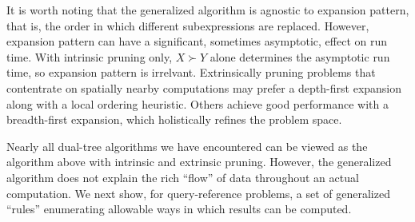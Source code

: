 \documentclass[twoside,leqno,twocolumn]{article}
\newcommand{\prefsplit}[2]{#1 \succ #2}
\newcommand{\summary}{\delta}
\newcommand{\gnp}{\psi}
\newcommand{\kdroot}[1]{#1^{\text{root}}}
\newcommand{\outstat}{\sigma}
\begin{document}


It is worth noting that the generalized algorithm is agnostic to expansion pattern, that is, the order in which different subexpressions are replaced.
However, expansion pattern can have a significant, sometimes asymptotic, effect on run time.
With intrinsic pruning only, $\prefsplit{X}{Y}$ alone determines the asymptotic run time, so expansion pattern is irrelvant.
Extrinsically pruning problems that contentrate on spatially nearby computations may prefer a depth-first expansion along with a local ordering heuristic.
Others achieve good performance with a breadth-first expansion, which holistically refines the problem space.

Nearly all dual-tree algorithms we have encountered can be viewed as the algorithm above with intrinsic and extrinsic pruning.
However, the generalized algorithm does not explain the rich ``flow'' of data throughout an actual computation.
We next show, for query-reference problems, a set of generalized ``rules'' enumerating allowable ways in which results can be computed.
\end{document}
